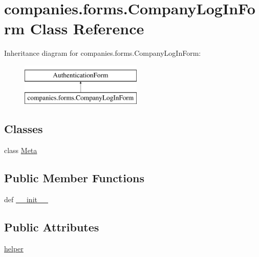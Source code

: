 \hypertarget{classcompanies_1_1forms_1_1_company_log_in_form}{\section{companies.\-forms.\-Company\-Log\-In\-Form Class Reference}
\label{classcompanies_1_1forms_1_1_company_log_in_form}
}
Inheritance diagram for companies.\-forms.\-Company\-Log\-In\-Form\-:\begin{figure}[H]
\begin{center}
\leavevmode
\includegraphics[height=2.000000cm]{classcompanies_1_1forms_1_1_company_log_in_form}
\end{center}
\end{figure}
\subsection*{Classes}
\begin{DoxyCompactItemize}
\item 
class \hyperlink{classcompanies_1_1forms_1_1_company_log_in_form_1_1_meta}{Meta}
\end{DoxyCompactItemize}
\subsection*{Public Member Functions}
\begin{DoxyCompactItemize}
\item 
def \hyperlink{classcompanies_1_1forms_1_1_company_log_in_form_aeb06702e4e3e4f5676d135bfd814756c}{\-\_\-\-\_\-init\-\_\-\-\_\-}
\end{DoxyCompactItemize}
\subsection*{Public Attributes}
\begin{DoxyCompactItemize}
\item 
\hyperlink{classcompanies_1_1forms_1_1_company_log_in_form_aac5dedbc7c5c5aeb1fd9480d22631ea1}{helper}
\end{DoxyCompactItemize}


